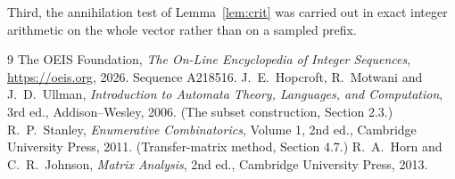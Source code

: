 \documentclass[11pt,a4paper]{article}
\theoremstyle{plain}
\theoremstyle{definition}
\begin{document}
Third, the annihilation test of Lemma~\ref{lem:crit} was carried out in exact integer
arithmetic on the whole vector rather than on a sampled prefix.

\begin{thebibliography}{9}
 The OEIS Foundation, \emph{The On-Line Encyclopedia of Integer
Sequences}, \url{https://oeis.org}, 2026. Sequence A218516.
 J.~E.~Hopcroft, R.~Motwani and J.~D.~Ullman, \emph{Introduction to Automata
Theory, Languages, and Computation}, 3rd ed., Addison--Wesley, 2006. (The subset
construction, Section 2.3.)
 R.~P.~Stanley, \emph{Enumerative Combinatorics}, Volume 1, 2nd ed.,
Cambridge University Press, 2011. (Transfer-matrix method, Section 4.7.)
 R.~A.~Horn and C.~R.~Johnson, \emph{Matrix Analysis}, 2nd ed., Cambridge
University Press, 2013.
\end{thebibliography}
\end{document}
